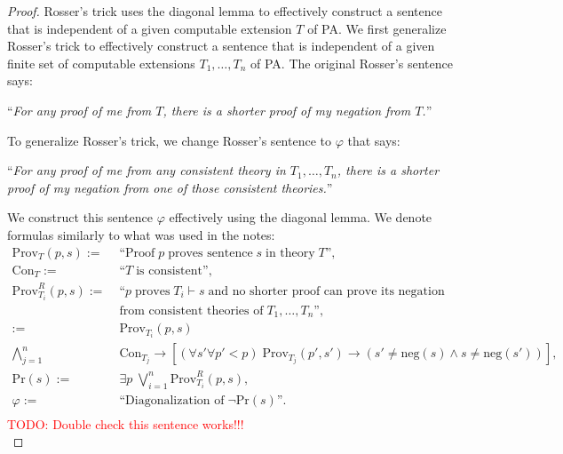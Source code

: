 \documentclass{article}
\newcommand{\TODO}[1]{\textcolor{red}{TODO: #1}}
\begin{document}
\begin{enumerate}[label={\bf Q\arabic*:}]
    \begin{proof}
      Rosser's trick uses the diagonal lemma to effectively construct a
      sentence that is independent of a given computable extension $T$ of
      PA. We first generalize Rosser's trick to effectively construct a
      sentence that is independent of a given finite set of computable
      extensions $T_1,\ldots,T_n$ of PA. The original Rosser's sentence
      says:
      \begin{center}
        ``\textit{For any proof of me from $T$, there is a shorter proof of my
        negation from $T$.}''
      \end{center}

      To generalize Rosser's trick, we change Rosser's sentence to
      $\varphi$ that says:
      \begin{center}
        ``\textit{For any proof of me from any consistent theory in
        $T_1,\ldots,T_n$, there is a shorter proof of my
        negation from one of those consistent theories.}''
      \end{center}

      We construct this sentence $\varphi$ effectively using the diagonal
      lemma. We denote formulas similarly to what was used in the notes:
      \begin{align*}
        \text{Prov}_T(p,s) :=&\;\text{``Proof}\; p\; \text{proves
          sentence}\; s\; \text{in theory}\; T\text{''},\\
        \text{Con}_T :=&\;\text{``}T\; \text{is consistent''},\\
        \text{Prov}_{T_i}^R(p,s) :=&\;\text{``}p\; \text{proves}\;
          T_i\vdash s\; \text{and no shorter proof can prove its
          negation}\\
          &\;\text{from consistent theories of}\; T_1,\ldots,T_n
          \text{''},\\ :=&\;\text{Prov}_{T_i}(p,s)\\
          \bigwedge_{j=1}^n&\; \text{Con}_{T_j} \rightarrow [(\forall
          s'\forall p'<p)\; \text{Prov}_{T_j}(p',s') \rightarrow
          (s'\neq\text{neg}(s) \wedge s\neq\text{neg}(s'))], \\
        \text{Pr}(s) :=&\;\exists p\; \bigvee_{i=1}^n
          \text{Prov}_{T_i}^R(p,s),\\
        \varphi :=&\;\text{``Diagonalization of}\; \neg\text{Pr}(s)
          \text{''}.\\
      \end{align*}
      \TODO{Double check this sentence works!!!}\\


\end{proof}
\end{enumerate}
\end{document}
